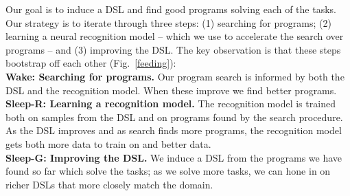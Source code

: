 \documentclass{article}
\newcommand{\system}{\textsc{DreamCoder}~}
\begin{document}
Our goal  is to induce a DSL and find good programs solving each of the tasks.
Our strategy is to iterate through three steps: (1) searching for programs; (2) learning a neural recognition model -- which we use
to accelerate the search over programs -- and (3) improving the DSL.
The key observation is that these steps bootstrap off each other (Fig.~\ref{feeding}):
\\\noindent \textbf{Wake: Searching for programs.}  Our program search  is informed by both the DSL and the recognition model.
When these improve we find better programs.
\\\noindent\textbf{Sleep-R: Learning a recognition model.} The recognition model is trained both on samples from the DSL and on programs found by the search procedure. As the DSL improves and as search finds more programs, the recognition model gets both more data to train on and better data.
\\\noindent\textbf{Sleep-G: Improving the DSL.} We induce a DSL from the programs we have found so far which solve the tasks;
  as we solve more tasks, we can hone in on richer DSLs that more closely match the domain.

\end{document}
